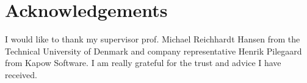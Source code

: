 \chapter{Acknowledgements}

I would like to thank my supervisor prof. Michael Reichhardt Hansen from the Technical University of Denmark and company representative Henrik Pilegaard from Kapow Software. I am really grateful for the trust and advice I have received.


